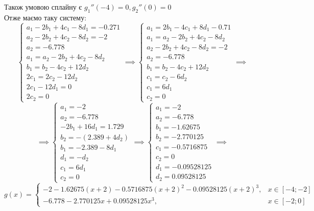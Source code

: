 \documentclass[14 pt]{extarticle}
\begin{document}
Також умовою сплайну є $g_1''(-4)=0, g_2''(0)=0$\\ 
Отже маємо таку систему:
$$
\begin{cases}
    a_1 - 2b_1 + 4 c_1 - 8 d_1 = -0.271 \\ 
    a_2 - 2 b_2 + 4 c_2 - 8 d_2 = -2 \\ 
    a_2 = -6.778 \\ 
    a_1 = a_2 -2 b_2 + 4 c_2 - 8 d_2 \\
    b_1 = b_2 - 4 c_2 +12 d_2 \\ 
    2c_1 = 2c_2 - 12d_2 \\ 
    2c_1 - 12 d_1 = 0 \\ 
    2c_2 = 0
\end{cases} \implies
\begin{cases}
    a_1 = 2b_1 - 4 c_1 + 8 d_1 - 0.71 \\ 
    a_1 = a_2 - 2 b_2 + 4 c_2 - 8d_2 \\ 
    a_2 - 2 b_2 + 4 c_2 - 8 d_2 = -2 \\
    a_2 = -6.778 \\ 
    b_1 = b_2 - 4c_2 + 12d_2 \\ 
    c_1 = c_2 - 6d_2 \\ 
    c_1 = 6d_1 \\ 
    c_2 = 0 
\end{cases} \implies
$$
$$\implies
\begin{cases}
    a_1 = -2 \\
    a_2 = -6.778 \\ 
    - 2b_1+16 d_1 = 1.729 \\ 
    b_2= -(2.389 + 4 d_2) \\ 
    b_1 = -2.389 -8 d_1 \\ 
    d_1 = -d_2 \\ 
    c_1 = 6 d_1 \\ 
    c_2 = 0
\end{cases} \implies
\begin{cases}
    a_1 = -2 \\ 
    a_2 = -6.778 \\ 
    b_1 = -1.62675\\
    b_2 = -2.770125 \\ 
    c_1 = -0.5716875 \\ 
    c_2 = 0 \\ 
    d_1 = -0.09528125 \\ 
    d_2 = 0.09528125 
\end{cases} \implies
$$
$$
g(x)
=\begin{cases}
    -2 - 1.62675 (x+2) -0.5716875 (x+2)^2 -0.09528125 (x+2)^3, & x \in [-4;-2] \\ 
    -6.778 -2.770125 x + 0.09528125 x^3, & x \in [-2;0]
\end{cases}
$$
\end{document}
